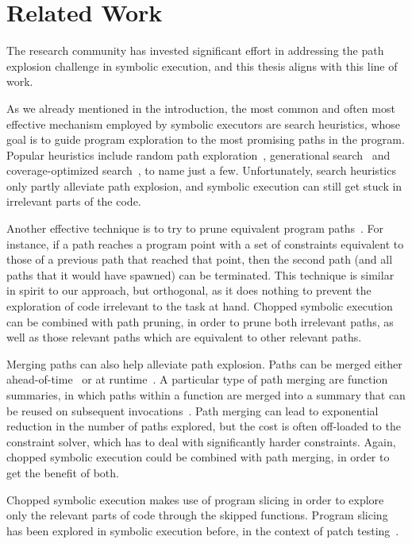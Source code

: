 
\chapter{Related Work}\label{chapter:related}

The research community has invested significant effort in addressing
the path explosion challenge in symbolic execution, and this thesis
aligns with this line of work.

As we already mentioned in the introduction, the most common and often
most effective mechanism employed by symbolic executors are search
heuristics, whose goal is to guide program exploration to the most
promising paths in the program.  Popular heuristics include random
path exploration~\cite{klee}, generational search~\cite{sage} and
coverage-optimized search~\cite{exe,sen:concolicheuristics}, to name
just a few.  Unfortunately, search heuristics only partly alleviate
path explosion, and symbolic execution can still get stuck in
irrelevant parts of the code.

Another effective technique is to try to prune equivalent program
paths~\cite{exe:tacas,rwset2}.  For instance, if a path reaches a
program point with a set of constraints equivalent to those of a
previous path that reached that point, then the second path (and all
paths that it would have spawned) can be terminated.  This technique
is similar in spirit to our approach, but orthogonal, as it does
nothing to prevent the exploration of code irrelevant to the task at
hand.  Chopped symbolic execution can be combined with path pruning,
in order to prune both irrelevant paths, as well as those relevant
paths which are equivalent to other relevant paths.

Merging paths can also help alleviate path explosion.  Paths can be
merged either ahead-of-time~\cite{klee-fp,kleecl:tse} or at
runtime~\cite{merging:pldi12,multise:fse15}. A particular type of path
merging are function summaries, in which paths within a function are
merged into a summary that can be reused on subsequent
invocations~\cite{godefroid:popl,godefroid:tacas}. Path merging can
lead to exponential reduction in the number of paths explored, but the
cost is often off-loaded to the constraint solver, which has to deal
with significantly harder constraints.  Again, chopped symbolic
execution could be combined with path merging, in order to get the
benefit of both.

Chopped symbolic execution makes use of program slicing in order to
explore only the relevant parts of code through the skipped functions.
Program slicing has been explored in symbolic execution before, \eg in
the context of patch testing~\cite{babic11}.


